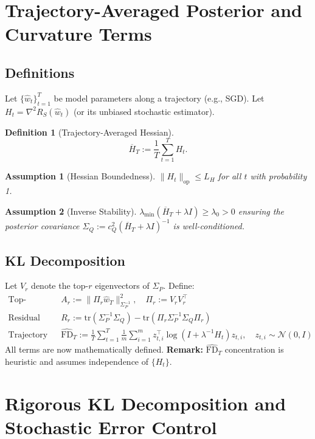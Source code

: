 \documentclass[11pt]{article}
\newtheorem{definition}{Definition}[section]
\newtheorem{assumption}{Assumption}[section]
\begin{document}
\section{Trajectory-Averaged Posterior and Curvature Terms}

\subsection{Definitions}
Let $\{\widehat{w}_t\}_{t=1}^T$ be model parameters along a trajectory (e.g., SGD).  
Let $H_t = \nabla^2 R_S(\widehat{w}_t)$ (or its unbiased stochastic estimator).

\begin{definition}[Trajectory-Averaged Hessian]
\[
\overline{H}_T := \frac{1}{T}\sum_{t=1}^T H_t.
\]
\end{definition}

\begin{assumption}[Hessian Boundedness]
\(\|H_t\|_{\mathrm{op}} \le L_H\) for all $t$ with probability 1.
\end{assumption}

\begin{assumption}[Inverse Stability]
\(\lambda_{\min}(\overline{H}_T + \lambda I) \ge \lambda_0 > 0\)
ensuring the posterior covariance
\(\Sigma_Q := c_Q^2 (\overline{H}_T + \lambda I)^{-1}\)
is well-conditioned.
\end{assumption}

\subsection{KL Decomposition}
Let $V_r$ denote the top-$r$ eigenvectors of $\Sigma_P$.  
Define:
\begin{align}
\text{Top-subspace alignment: } & A_r := \|\Pi_r \widehat{w}_T\|_{\Sigma_P^{-1}}^2, \quad \Pi_r := V_r V_r^\top \\
\text{Residual spectral complexity: } & R_r := \mathrm{tr}(\Sigma_P^{-1}\Sigma_Q) - \mathrm{tr}(\Pi_r \Sigma_P^{-1}\Sigma_Q \Pi_r) \\
\text{Trajectory curvature (stochastic log-det): } & \widehat{\mathrm{FD}}_T := \frac{1}{T} \sum_{t=1}^T \frac{1}{m} \sum_{i=1}^m z_{t,i}^\top \log(I+\lambda^{-1} H_t) z_{t,i}, \quad z_{t,i}\sim \mathcal{N}(0,I)
\end{align}
All terms are now mathematically defined.  
\textbf{Remark:} $\widehat{\mathrm{FD}}_T$ concentration is heuristic and assumes independence of $\{H_t\}$.

\section{Rigorous KL Decomposition and Stochastic Error Control}
\label{sec:kl_stochastic}
\end{document}
